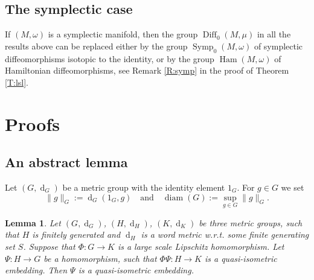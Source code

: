 \documentclass[a4paper,12pt]{amsart}
\def\Diff{\operatorname{Diff}}
\def\diam{\operatorname{diam}}
\newtheorem{lem}[thm]{Lemma}
\theoremstyle{definition}
\def\OP{\operatorname}
\begin{document}
\subsection{The symplectic case}\label{SS:symp}

If $(M,\omega)$ is a symplectic manifold, then
the group $\Diff_0(M,\mu)$ in all the results above
can be replaced either by the group $\OP{Symp}_0(M,\omega)$
of symplectic diffeomorphisms isotopic to the identity,
or by the group $\OP{Ham}(M,\omega)$
of Hamiltonian diffeomorphisms, see Remark \ref{R:symp}
in the proof of Theorem \ref{T:lsl}.

\section{Proofs}\label{S:proofs}

\subsection{An abstract lemma}\label{SS:abstract}

Let $(G,\OP{d}_G)$ be a metric group with the identity element
$1_G$. For $g\in G$ we set
$$\|g\|_G:=\OP{d}_G(1_G,g)\quad\textrm{and}\quad \diam(G):=\sup\limits_{g\in G}\|g\|_G.$$

\begin{lem}\label{L:abstract}
Let $(G,\OP{d}_G)$, $(H,\OP{d}_H)$, $(K,\OP{d}_K)$ be three metric groups, such
that $H$ is finitely generated and $\OP{d}_H$ is a word metric w.r.t. some
finite generating set $S$. Suppose that $\Phi\colon G\to K$ is a large scale
Lip\-schitz homomorphism. Let $\Psi\colon H\to G$ be a homomorphism, such that
$\Phi\Psi\colon H\to K$ is a quasi-isometric embedding.  Then $\Psi$ is a
quasi-isometric embedding.
\end{lem}
\end{document}
